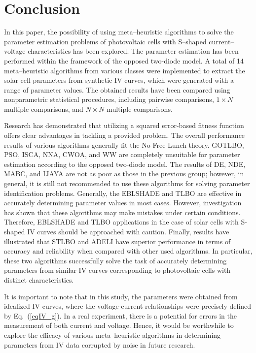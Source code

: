 \documentclass[a4paper,fleqn]{cas-sc}
\begin{document}
\section{Conclusion}

In this paper, the possibility of using meta--heuristic algorithms
to solve the parameter estimation problems of photovoltaic cells
with S--shaped current--voltage characteristics has been explored.
The parameter estimation has been performed within the framework of the opposed two-diode model.
A total of 14 meta--heuristic algorithms from various classes were implemented
to extract the solar cell parameters from synthetic IV curves, which were generated with a range of parameter values.
The obtained results have been compared using nonparametric statistical procedures,
including pairwise comparisons, $1\times N$ multiple comparisons, and $N\times N$ multiple comparisons.

Research has demonstrated that utilizing a squared error-based fitness function offers clear advantages in tackling a provided problem.
The overall performance results of various algorithms generally fit the No Free Lunch theory.
GOTLBO, PSO, ISCA, NNA, CWOA, and WW are completely unsuitable for parameter estimation according to the opposed two-diode model.
The results of DE, NDE, MABC, and IJAYA are not as poor as those in the previous group;
however, in general, it is still not recommended to use these algorithms for solving parameter identification problems.
Generally, the EBLSHADE and TLBO are effective in accurately determining parameter values in most cases.
However, investigation has shown that these algorithms may make mistakes under certain conditions.
Therefore, EBLSHADE and TLBO applications in the case of solar cells with S-shaped IV curves should be approached with caution.
Finally, results have illustrated that STLBO and ADELI have superior performance in terms of accuracy and reliability
when compared with other used algorithms.
In particular, these two algorithms successfully solve the task of accurately determining parameters
from similar IV curves corresponding to photovoltaic cells with distinct characteristics.

It is important to note that in this study,
the parameters were obtained from idealized IV curves,
where the voltage-current relationships were precisely defined by Eq.~(\ref{eqIV_g}).
In a real experiment, there is a potential for errors in the measurement of both current and voltage.
Hence,  it would be worthwhile to explore the efficacy of various meta--heuristic algorithms
in determining parameters from IV data corrupted by noise in future research.
\end{document}
